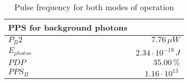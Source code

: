 \begin{table}[H]
\centering
\caption{Pulse frequency for both modes of operation}
\label{tab:PPS}
\begin{tabular}{|l|r|}\hline
    \textbf{PPS for background photons} & \\
    \hline 
    $P_B2$ & $7.76\,\mu W$ \\
    $E_{photon}$ & $2.34\cdot10^{-19}\,J$ \\
    $PDP$ & $35.00\, \%$ \\
    $PPS_B$ & $1.16\cdot10^{13}\,$ \\
    \hline 
\end{tabular}
\end{table}
